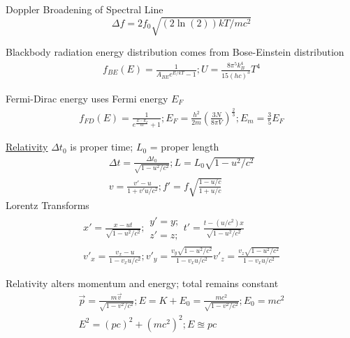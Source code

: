 \documentclass[8pt]{extarticle}
\newcommand{\e}[1]{e^{#1}}
\begin{document}
        Doppler Broadening of Spectral Line
        \begin{equation*}
            \Delta f = 2f_0\sqrt{(2\ln(2))kT/mc^2}
        \end{equation*}

        Blackbody radiation energy distribution comes from Bose-Einstein distribution
        \begin{gather*}
            f_{BE}(E) = \frac{1}{A_{BE}\e{E/kT} - 1};
            U = \frac{8\pi^5 k_{B}^4}{15(hc)^3}T^4
        \end{gather*}

        Fermi-Dirac energy uses Fermi energy $E_F$
        \begin{gather*}
            f_{FD}(E) = \frac{1}{\e{\frac{E - E_F}{kT}} + 1};
            E_F = \frac{h^2}{2m}\left( \frac{3N}{8\pi V} \right)^\frac{2}{3}; 
            E_m = \frac{3}{5}E_F
        \end{gather*}

    \underline{Relativity}
        $\Delta t_0$ is proper time; $L_0$ = proper length
        \begin{gather*}
            \Delta t = \frac{\Delta t_0}{\sqrt{1 - u^2/c^2}}; 
            L = L_0\sqrt{1 - u^2/c^2}\\
            v = \frac{v' - u}{1 + v'u/c^2}; 
            f' = f\sqrt{\frac{1 - u/c}{1 + u/c}}
        \end{gather*}
        Lorentz Transforms
        \footnotesize
        \begin{gather*}
            x' = \frac{x - ut}{\sqrt{1 - u^2/c^2}};
            \begin{matrix}
                y' = y;\\
                z' = z;
            \end{matrix}
            t' = \frac{t - (u/c^2)x}{\sqrt{1 - u^2/c^2}}\\
            v'_x = \frac{v_x - u}{1 - v_x u/c^2};
            v'_y = \frac{v_y \sqrt{1 - u^2 / c^2}}{1 - v_x u/c^2}
            v'_z = \frac{v_z \sqrt{1 - u^2 / c^2}}{1 - v_x u/c^2}
        \end{gather*}
        \normalsize

        Relativity alters momentum and energy; total remains constant
        \begin{gather*}
            \vec{p} = \frac{m\vec{v}}{\sqrt{1 - v^2/c^2}};
            E   =   K + E_0
                =   \frac{mc^2}{\sqrt{1 - v^2/c^2}};
            E_0 =   mc^2\\
            E^2 =   (pc)^2 + (mc^2)^2; E \approxeq pc
        \end{gather*}
\end{document}
